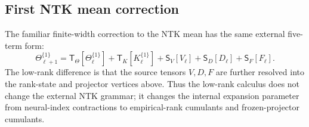 \documentclass{article}
\begin{document}
\subsection{First NTK mean correction}
The familiar finite-width correction to the NTK mean has the same external five-term form:
\begin{equation}
\Theta^{\{1\}}_{\ell+1}
=\mathsf T_\Theta[\Theta^{\{1\}}_\ell]
+\mathsf T_K[K^{\{1\}}_\ell]
+\mathsf S_V[V_\ell]
+\mathsf S_D[D_\ell]
+\mathsf S_F[F_\ell].
\label{eq:appendix-theta-five}
\end{equation}
The low-rank difference is that the source tensors \(V,D,F\) are further resolved into the rank-state and projector vertices above. Thus the low-rank calculus does not change the external NTK grammar; it changes the internal expansion parameter from neural-index contractions to empirical-rank cumulants and frozen-projector cumulants.
\end{document}
